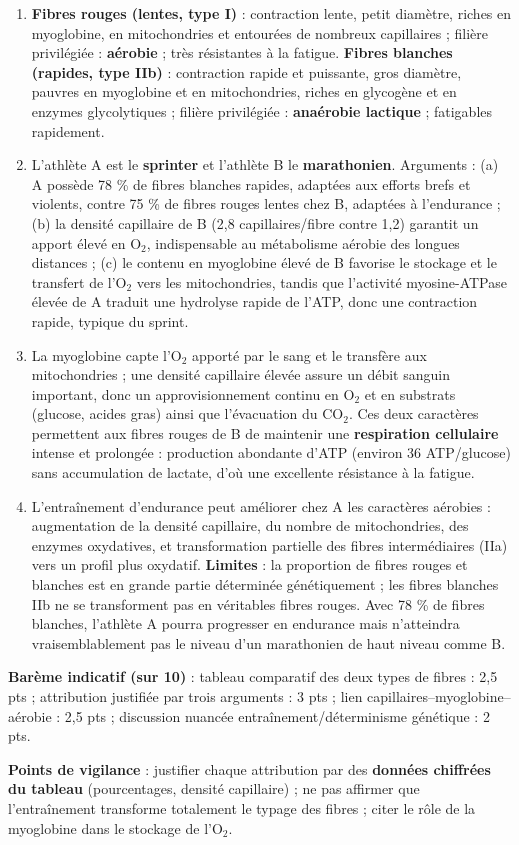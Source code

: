 \documentclass[11pt]{article}
\begin{document}
\begin{corrige}
\begin{enumerate}
\item \textbf{Fibres rouges (lentes, type I)} : contraction lente, petit diamètre, riches en myoglobine, en mitochondries et entourées de nombreux capillaires ; filière privilégiée : \textbf{aérobie} ; très résistantes à la fatigue. \textbf{Fibres blanches (rapides, type IIb)} : contraction rapide et puissante, gros diamètre, pauvres en myoglobine et en mitochondries, riches en glycogène et en enzymes glycolytiques ; filière privilégiée : \textbf{anaérobie lactique} ; fatigables rapidement.
\item L'athlète A est le \textbf{sprinter} et l'athlète B le \textbf{marathonien}. Arguments : (a) A possède 78 \% de fibres blanches rapides, adaptées aux efforts brefs et violents, contre 75 \% de fibres rouges lentes chez B, adaptées à l'endurance ; (b) la densité capillaire de B (2,8 capillaires/fibre contre 1,2) garantit un apport élevé en O$_2$, indispensable au métabolisme aérobie des longues distances ; (c) le contenu en myoglobine élevé de B favorise le stockage et le transfert de l'O$_2$ vers les mitochondries, tandis que l'activité myosine-ATPase élevée de A traduit une hydrolyse rapide de l'ATP, donc une contraction rapide, typique du sprint.
\item La myoglobine capte l'O$_2$ apporté par le sang et le transfère aux mitochondries ; une densité capillaire élevée assure un débit sanguin important, donc un approvisionnement continu en O$_2$ et en substrats (glucose, acides gras) ainsi que l'évacuation du CO$_2$. Ces deux caractères permettent aux fibres rouges de B de maintenir une \textbf{respiration cellulaire} intense et prolongée : production abondante d'ATP (environ 36 ATP/glucose) sans accumulation de lactate, d'où une excellente résistance à la fatigue.
\item L'entraînement d'endurance peut améliorer chez A les caractères aérobies : augmentation de la densité capillaire, du nombre de mitochondries, des enzymes oxydatives, et transformation partielle des fibres intermédiaires (IIa) vers un profil plus oxydatif. \textbf{Limites} : la proportion de fibres rouges et blanches est en grande partie déterminée génétiquement ; les fibres blanches IIb ne se transforment pas en véritables fibres rouges. Avec 78 \% de fibres blanches, l'athlète A pourra progresser en endurance mais n'atteindra vraisemblablement pas le niveau d'un marathonien de haut niveau comme B.
\end{enumerate}
\textbf{Barème indicatif (sur 10)} : tableau comparatif des deux types de fibres : 2,5 pts ; attribution justifiée par trois arguments : 3 pts ; lien capillaires--myoglobine--aérobie : 2,5 pts ; discussion nuancée entraînement/déterminisme génétique : 2 pts.\par
\textbf{Points de vigilance} : justifier chaque attribution par des \textbf{données chiffrées du tableau} (pourcentages, densité capillaire) ; ne pas affirmer que l'entraînement transforme totalement le typage des fibres ; citer le rôle de la myoglobine dans le stockage de l'O$_2$.
\end{corrige}
\end{document}
